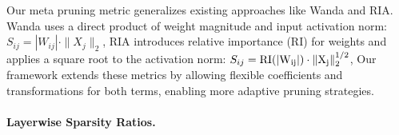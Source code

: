 


Our meta pruning metric generalizes existing approaches like Wanda and RIA. Wanda \citep{sun2023simple} uses a direct product of weight magnitude and input activation norm: $S_{ij}=|W_{ij}|\cdot\|X_{j}\|_{2}$,
RIA \citep{zhangplug} introduces relative importance (RI) for weights and applies a square root to the activation norm:
$S_{ij}=\rm{RI}(|W_{ij}|)\cdot\|X_{j}\|_{2}^{1/2}$, 
Our framework extends these metrics by allowing flexible coefficients and transformations for both terms, enabling more adaptive pruning strategies.



\paragraph{Layerwise Sparsity Ratios.}

